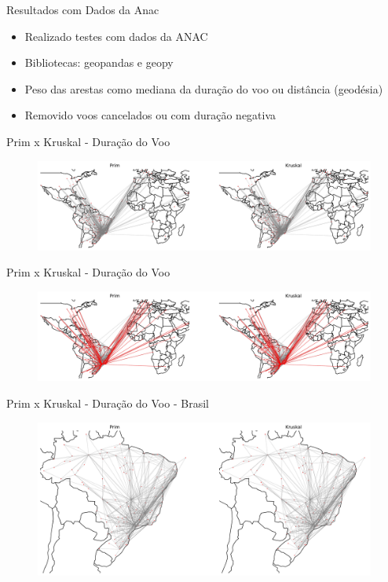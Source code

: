 \documentclass[aspectratio=169,usenames,dvipsnames]{beamer}
\begin{document}
\begin{frame}{Resultados com Dados da Anac}

    \vfill
    \begin{itemize}
        \item Realizado testes com dados da ANAC
        \item Bibliotecas: geopandas e geopy
        \item Peso das arestas como mediana da duração do voo ou distância (geodésia)
        \item Removido voos cancelados ou com duração negativa
    \end{itemize}
    \vfill
\end{frame}

\begin{frame}{Prim x Kruskal - Duração do Voo}
    \begin{figure}[ht]
        \centering
        \includegraphics[width=\textwidth]{figs/world_time_mst_0.pdf}
    \end{figure}
\end{frame}

\begin{frame}{Prim x Kruskal - Duração do Voo}
    \begin{figure}[ht]
        \centering
        \includegraphics[width=\textwidth]{figs/world_time_mst_1.pdf}
    \end{figure}
\end{frame}

\begin{frame}{Prim x Kruskal - Duração do Voo - Brasil}
    \begin{figure}[ht]
        \centering
        \includegraphics[width=\textwidth]{figs/brasil_time_mst_0.pdf}
    \end{figure}
\end{frame}
\end{document}
